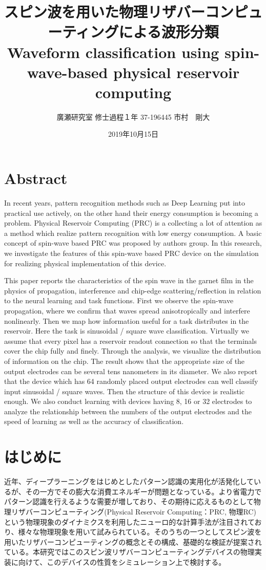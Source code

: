 \documentclass[a4j, twocolumn]{jsarticle}
\title{スピン波を用いた物理リザバーコンピューティングによる波形分類\\Waveform classification using spin-wave-based physical reservoir computing}
\author{廣瀬研究室 修士過程１年 37-196445 市村　剛大}
\date{2019年10月15日}
\begin{document}

\section*{Abstract}
In recent years, pattern recognition methods such as Deep Learning put into practical use actively, on the other hand their energy consumption is becoming a problem. Physical Reservoir Computing (PRC) is a collecting a lot of attention as a method which realize pattern recognition with low energy consumption. A basic concept of spin-wave based PRC was proposed by authors group. In this research, we investigate the features of this spin-wave based PRC device on the simulation for realizing physical implementation of this device.

This paper reports the characteristics of the spin wave in the garnet film in the physics of propagation, interference and chip-edge scattering/reflection in relation to the neural learning and task functions. First we observe the spin-wave propagation, where we confirm that waves spread anisotropically and interfere nonlinearly. Then we map how information useful for a task distributes in the reservoir. Here the task is sinusoidal / square wave classification. Virtually we assume that every pixel has a reservoir readout connection so that the terminals cover the chip fully and finely. Through the analysis, we visualize the distribution of information on the chip. The result shows that the appropriate size of the output electrodes can be several tens nanometers in its diameter. We also report that the device which has 64 randomly placed output electrodes can well classify input sinusoidal / square waves. Then the structure of this device is realistic enough. We also conduct learning with devices having 8, 16 or 32 electrodes to analyze the relationship between the numbers of the output electrodes and the speed of learning as well as the accuracy of classification.

\section{はじめに}
近年、ディープラーニングをはじめとしたパターン認識の実用化が活発化しているが、その一方でその膨大な消費エネルギーが問題となっている。より省電力でパターン認識を行えるような需要が増しており、その期待に応えるものとして物理リザバーコンピューティング(Physical Reservoir Computing：PRC, 物理RC)という物理現象のダイナミクスを利用したニューロ的な計算手法が注目されており、様々な物理現象を用いて試みられている。そのうちの一つとしてスピン波を用いたリザバーコンピューティングの概念とその構成、基礎的な検証が提案されている。本研究ではこのスピン波リザバーコンピューティングデバイスの物理実装に向けて、このデバイスの性質をシミュレーション上で検討する。
\end{document}
